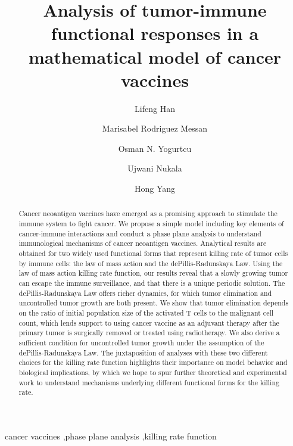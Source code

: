 \documentclass[review,authoryear]{elsarticle}
\begin{document}
\begin{frontmatter}

\title{Analysis of tumor-immune functional responses in a mathematical model
of cancer vaccines}




\author[mymainaddress]{Lifeng Han}
\author[mymainaddress]{Marisabel Rodriguez Messan}
\author[mymainaddress]{Osman N. Yogurtcu}
\author[mymainaddress]{Ujwani Nukala}
\author[mymainaddress]{Hong Yang}


\address[mymainaddress]{U.S. Food and Drug
Administration}



\begin{abstract}
Cancer neoantigen vaccines have emerged as a promising approach to stimulate
the immune system to fight cancer. We propose a simple model including key elements of cancer-immune interactions and conduct a phase plane analysis to understand immunological mechanisms of
cancer neoantigen vaccines. Analytical results are obtained for
two widely used functional forms that represent killing rate of tumor cells by immune cells:
the law of mass action and the dePillis-Radunskaya Law. Using the law
of mass action killing rate function, our results reveal that a slowly growing tumor can escape the immune surveillance, and that there is a unique periodic solution. The dePillis-Radunskaya Law offers richer dynamics, for which tumor elimination and uncontrolled tumor growth are both present. We show that tumor elimination depends
on the ratio of initial population size of the activated T cells to the malignant cell count, which lends support to using cancer vaccine
as an adjuvant therapy after the primary tumor is surgically removed or treated using radiotherapy. We also derive a sufficient condition for uncontrolled tumor growth under the assumption of the dePillis-Radunskaya Law. The juxtaposition of analyses with these two different choices for the killing rate function highlights their importance on model behavior and biological implications, by which we hope to spur further theoretical and experimental work to understand mechanisms underlying different functional forms for the killing rate. 
\end{abstract}

\begin{keyword}
cancer vaccines \sep phase plane analysis \sep killing rate function
\end{keyword}

\end{frontmatter}
\end{document}
